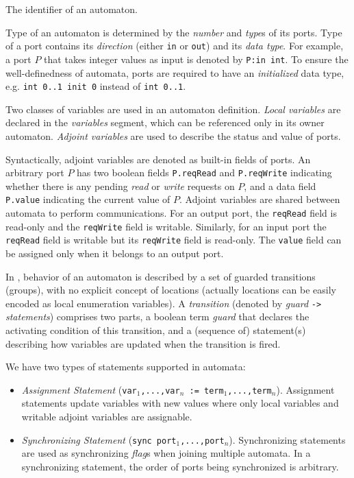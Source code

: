  The identifier of an automaton.

 Type of an automaton is determined by the \emph{number} and \emph{type}s of its ports. Type of a port contains its \emph{direction} (either \texttt{in} or \texttt{out}) and its \emph{data type}. For example, a port $P$ that takes integer values as input is denoted by \texttt{P:in int}. To ensure the well-definedness of automata, ports are required to have an \emph{initialized} data type, e.g. \texttt{int 0..1 init 0} instead of \texttt{int 0..1}.

 Two classes of variables are used in an automaton definition. \emph{Local variables} are declared in the \emph{variables} segment, which can be referenced only in its owner automaton. \emph{Adjoint variables} are used to describe the status and value of ports.

Syntactically, adjoint variables are denoted as built-in fields of ports.
An arbitrary port $P$ has two boolean fields \texttt{P.reqRead} and \texttt{P.reqWrite} indicating whether there is any pending \emph{read} or \emph{write} requests on $P$, and a data field \texttt{P.value} indicating the current value of $P$. Adjoint variables are shared between automata to perform communications.
For an output port, the \texttt{reqRead} field is read-only and the \texttt{reqWrite} field is writable. Similarly, for an input port the \texttt{reqRead} field is writable but its \texttt{reqWrite} field is read-only. The \texttt{value} field can be assigned only when it belongs to an output port.

In \lang{}, behavior of an automaton is described by a set of guarded transitions (groups), with no explicit concept of locations (actually locations can be easily encoded as local enumeration variables). A \emph{transition} (denoted by \emph{guard} \texttt{->} \emph{statements}) comprises two parts, a boolean term \emph{guard} that declares the activating condition of this transition, and a (sequence of) statement(s) describing how variables are updated when the transition is fired.

We have two types of statements supported in automata:
\begin{itemize}
    \item \emph{Assignment Statement} (\texttt{var$_1$,...,var$_n$ := term$_1$,...,term$_n$}). Assignment statements update variables with new values where only local variables and writable adjoint variables are assignable.
    \item \emph{Synchronizing Statement} (\texttt{sync port$_1$,...,port$_n$}). Synchronizing statements are used as synchronizing \emph{flag}s when joining multiple automata. In a synchronizing statement, the order of ports being synchronized is arbitrary. 
\end{itemize}

